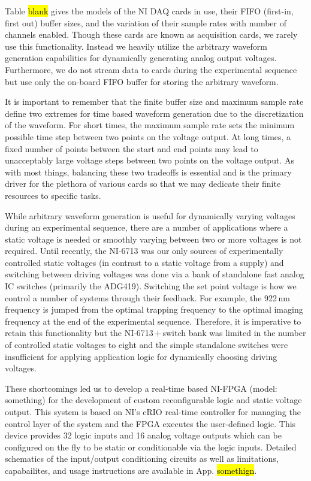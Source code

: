 Table \hl{blank} gives the models of the NI DAQ cards in use, their FIFO (first-in, first out) buffer sizes, and the variation of their sample rates with number of channels enabled.
Though these cards are known as acquisition cards, we rarely use this functionality.
Instead we heavily utilize the arbitrary waveform generation capabilities for dynamically generating analog output voltages.
Furthermore, we do not stream data to cards during the experimental sequence but use only the on-board FIFO buffer for storing the arbitrary waveform.

It is important to remember that the finite buffer size and maximum sample rate define two extremes for time based waveform generation due to the discretization of the waveform.
For short times, the maximum sample rate sets the minimum possible time step between two points on the voltage output.
At long times, a fixed number of points between the start and end points may lead to unacceptably large voltage steps between two points on the voltage output.
As with most things, balancing these two tradeoffs is essential and is the primary driver for the plethora of various cards so that we may dedicate their finite resources to specific tasks.

While arbitrary waveform generation is useful for dynamically varying voltages during an experimental sequence, there are a number of applications where a static voltage is needed or smoothly varying between two or more voltages is not required.
Until recently, the NI-6713 was our only sources of experimentally controlled static voltages (in contrast to a static voltage from a supply) and switching between driving voltages was done via a bank of standalone fast analog IC switches (primarily the ADG419).
Switching the set point voltage is how we control a number of systems through their feedback.
For example, the 922\,nm frequency is jumped from the optimal trapping frequency to the optimal imaging frequency at the end of the experimental sequence.
Therefore, it is imperative to retain this functionality but the NI-6713\,$+$\,switch bank was limited in the number of controlled static voltages to eight and the simple standalone switches were insufficient for applying application logic for dynamically choosing driving voltages.

These shortcomings led us to develop a real-time based NI-FPGA (model: something) for the development of custom reconfigurable logic and static voltage output.
This system is based on NI's cRIO real-time controller for managing the control layer of the system and the FPGA executes the user-defined logic.
This device provides 32 logic inputs and 16 analog voltage outputs which can be configured on the fly to be static or conditionable via the logic inputs.
Detailed schematics of the input/output conditioning circuits as well as limitations, capabailites, and usage instructions are available in App. \hl{somethign}.

